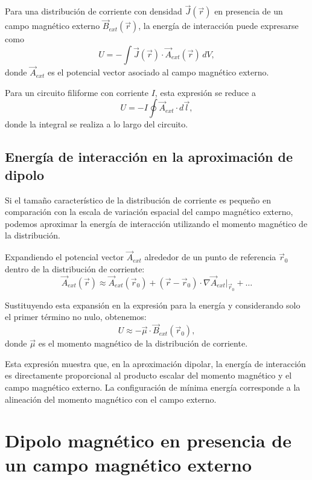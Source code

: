 \documentclass[12pt,a4paper]{book}
\begin{document}
Para una distribución de corriente con densidad $\vec{J}(\vec{r})$ en presencia de un campo magnético externo $\vec{B}_{ext}(\vec{r})$, la energía de interacción puede expresarse como
\begin{equation}
U = -\int \vec{J}(\vec{r}) \cdot \vec{A}_{ext}(\vec{r}) \, dV,
\end{equation}
donde $\vec{A}_{ext}$ es el potencial vector asociado al campo magnético externo.

Para un circuito filiforme con corriente $I$, esta expresión se reduce a
\begin{equation}
U = -I \oint \vec{A}_{ext} \cdot d\vec{l},
\end{equation}
donde la integral se realiza a lo largo del circuito.

\subsection{Energía de interacción en la aproximación de dipolo}

Si el tamaño característico de la distribución de corriente es pequeño en comparación con la escala de variación espacial del campo magnético externo, podemos aproximar la energía de interacción utilizando el momento magnético de la distribución.

Expandiendo el potencial vector $\vec{A}_{ext}$ alrededor de un punto de referencia $\vec{r}_0$ dentro de la distribución de corriente:
\begin{equation}
\vec{A}_{ext}(\vec{r}) \approx \vec{A}_{ext}(\vec{r}_0) + (\vec{r} - \vec{r}_0) \cdot \nabla \vec{A}_{ext}|_{\vec{r}_0} + \ldots
\end{equation}

Sustituyendo esta expansión en la expresión para la energía y considerando solo el primer término no nulo, obtenemos:
\begin{equation}
U \approx -\vec{\mu} \cdot \vec{B}_{ext}(\vec{r}_0),
\end{equation}
donde $\vec{\mu}$ es el momento magnético de la distribución de corriente.

Esta expresión muestra que, en la aproximación dipolar, la energía de interacción es directamente proporcional al producto escalar del momento magnético y el campo magnético externo. La configuración de mínima energía corresponde a la alineación del momento magnético con el campo externo.

\section{Dipolo magnético en presencia de un campo magnético externo}
\end{document}
